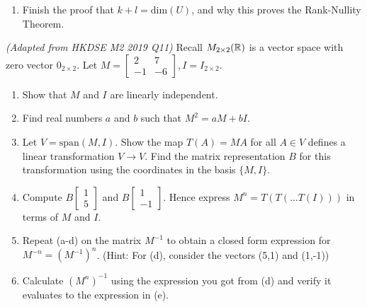 \begin{exerciselist}
\begin{enumerate}[label=(\alph*)]
		\item Finish the proof that $k+l=\textrm{dim}(U)$, and why this proves the Rank-Nullity Theorem.
	\end{enumerate}
	\item \textit{(Adapted from HKDSE M2 2019 Q11)} Recall $M_{2\times 2}(\mathbb{R})$ is a vector space with zero vector $0_{2\times 2}$. Let $M=\begin{bmatrix}
		2& 7\\-1&-6
	\end{bmatrix}, I=I_{2\times 2}$. \begin{enumerate}[label=(\alph*)]
		\item Show that $M$ and $I$ are linearly independent.
		\item Find real numbers $a$ and $b$ such that $M^2=aM+bI$.
		\item Let $V=\textrm{span}(M,I)$. Show the map $T(A)=MA$ for all $A\in V$ defines a linear transformation $V\to V$. Find the matrix representation $B$ for this transformation using the coordinates in the basis $\{M,I\}$.
		\item Compute $B\begin{bmatrix}
			1\\5
		\end{bmatrix}$ and $B\begin{bmatrix}
			1\\-1
		\end{bmatrix}$. Hence express $M^n = T(T(\ldots T(I)))$ in terms of $M$ and $I$.
		\item Repeat (a-d) on the matrix $M^{-1}$ to obtain a closed form expression for $M^{-n}=(M^{-1})^{n}$. (Hint: For (d), consider the vectors (5,1) and (1,-1))
		\item Calculate $(M^n)^{-1}$ using the expression you got from (d) and verify it evaluates to the expression in (e).
	\end{enumerate}
\end{exerciselist}
